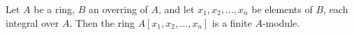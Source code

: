 Let $A$ be a ring, $B$ an overring of $A$, and let $x_1, x_2, \dots, x_n$ be elements of $B$, each integral over $A$. Then the ring $A[x_1, x_2, \dots, x_n]$ is a finite $A$-module.

